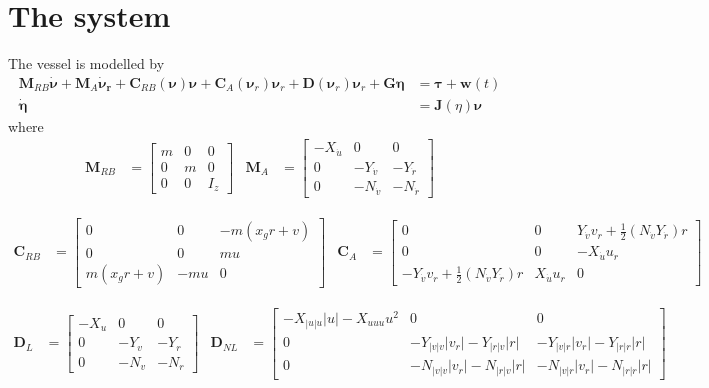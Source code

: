 \documentclass[12pt,a4]{article}
\begin{document}
\section{The system}
The vessel is modelled by
\begin{align}
	\bm{M}_{RB}\bm{\dot{\nu}} + \bm{M}_{A}\bm{\dot{\nu}_r} + \bm{C}_{RB}(\bm{\nu})\bm{\nu} + \bm{C}_{A}(\bm{\nu}_r)\bm{\nu}_r
	+ \bm{D}(\bm{\nu}_r)\bm{\nu}_r +\bm{G}\bm{\eta} & = \bm{\tau} + \bm{w}(t) \\
	\bm{\dot{\eta}}                                 & = \bm{J}(\eta)\bm{\nu}
\end{align}
where
\begin{align}
	\bm{M}_{RB} & = \begin{bmatrix}
		m & 0 & 0     \\
		0 & m & 0     \\
		0 & 0 & I_{z}
	\end{bmatrix} &
	\bm{M}_{A}  & = \begin{bmatrix}
		-X_{\dot{u}} & 0            & 0            \\
		0            & -Y_{\dot{v}} & -Y_{\dot{r}} \\
		0            & -N_{\dot{v}} & -N_{\dot{r}}
	\end{bmatrix}
\end{align}


\begin{align}
	\bm{C}_{RB} & = \begin{bmatrix}
		0           & 0   & -m(x_g r +v) \\
		0           & 0   & mu           \\
		m(x_g r +v) & -mu & 0
	\end{bmatrix} &
	\bm{C}_{A}  & = \begin{bmatrix}
		0                                                        & 0               & Y_{\dot{v}} v_r + \frac{1}{2}(N_{\dot{v}} Y_{\dot{r}})r \\
		0                                                        & 0               & -X_{\dot{u}} u_r                                        \\
		-Y_{\dot{v}} v_r + \frac{1}{2}(N_{\dot{v}} Y_{\dot{r}})r & X_{\dot{u}} u_r & 0
	\end{bmatrix}
\end{align}

\begin{align}
	\bm{D}_{L}  & = \begin{bmatrix}
		-X_u & 0    & 0    \\
		0    & -Y_v & -Y_r \\
		0    & -N_v & -N_r
	\end{bmatrix} &
	\bm{D}_{NL} & = \begin{bmatrix}
		-X_{|u|u}|u| - X_{uuu}u^2 & 0                           & 0                           \\
		0                         & -Y_{|v|v}|v_r| -Y_{|r|v}|r| & -Y_{|v|r}|v_r| -Y_{|r|r}|r| \\
		0                         & -N_{|v|v}|v_r| -N_{|r|v}|r| & -N_{|v|r}|v_r| -N_{|r|r}|r|
	\end{bmatrix}
\end{align}
\end{document}
